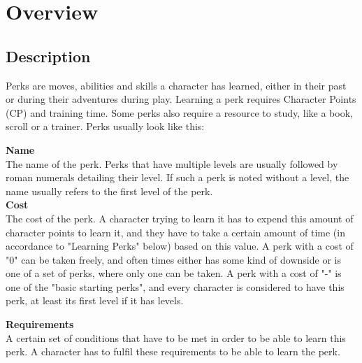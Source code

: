 \chapter{Overview}\label{ch:perksOverview}
\section{Description}
Perks are moves, abilities and skills a character has learned, either in their past or during their adventures during play. Learning a perk requires Character Points (CP) and training time. Some perks also require a resource to study, like a book, scroll or a trainer. Perks usually look like this:

\textbf{Name}\\
The name of the perk.
Perks that have multiple levels are usually followed by roman numerals detailing their level.
If such a perk is noted without a level, the name usually refers to the first level of the perk.\\

\textbf{Cost}\\
The cost of the perk.
A character trying to learn it has to expend this amount of character points to learn it, and they have to take a certain amount of time (in accordance to "Learning Perks" below) based on this value. A perk with a cost of "0" can be taken freely, and often times either has some kind of downside or is one of a set of perks, where only one can be taken. A perk with a cost of "-" is one of the "basic starting perks", and every character is considered to have this perk, at least its first level if it has levels.

\textbf{Requirements}\\
A certain set of conditions that have to be met in order to be able to learn this perk.
A character has to fulfil these requirements to be able to learn the perk.


